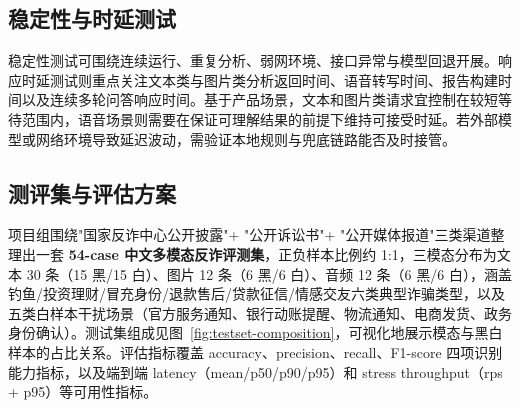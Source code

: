 \documentclass[UTF8,a4paper,12pt]{ctexart}
\begin{document}
\subsection{稳定性与时延测试}

稳定性测试可围绕连续运行、重复分析、弱网环境、接口异常与模型回退开展。响应时延测试则重点关注文本类与图片类分析返回时间、语音转写时间、报告构建时间以及连续多轮问答响应时间。基于产品场景，文本和图片类请求宜控制在较短等待范围内，语音场景则需要在保证可理解结果的前提下维持可接受时延。若外部模型或网络环境导致延迟波动，需验证本地规则与兜底链路能否及时接管。

\subsection{测评集与评估方案}

项目组围绕"国家反诈中心公开披露"+ "公开诉讼书"+ "公开媒体报道"三类渠道整理出一套 \textbf{54-case 中文多模态反诈评测集}，正负样本比例约 1:1，三模态分布为文本 30 条（15 黑/15 白）、图片 12 条（6 黑/6 白）、音频 12 条（6 黑/6 白），涵盖钓鱼/投资理财/冒充身份/退款售后/贷款征信/情感交友六类典型诈骗类型，以及五类白样本干扰场景（官方服务通知、银行动账提醒、物流通知、电商发货、政务身份确认）。测试集组成见图~\ref{fig:testset-composition}，可视化地展示模态与黑白样本的占比关系。评估指标覆盖 accuracy、precision、recall、F1-score 四项识别能力指标，以及端到端 latency（mean/p50/p90/p95）和 stress throughput（rps + p95）等可用性指标。
\end{document}
